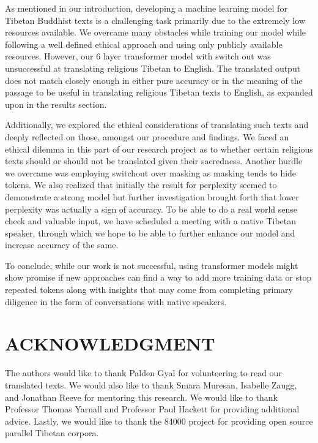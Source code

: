 \documentclass[letterpaper, 12 pt, conference]{ieeeconf}  %
\begin{document}
As mentioned in our introduction, developing a machine learning model for Tibetan Buddhist texts is a challenging task primarily due to the extremely low resources available. We overcame many obstacles while training our model  while following a well defined ethical approach and using only  publicly available resources. However, our 6 layer transformer model with switch out was unsuccessful at translating religious Tibetan to English. The translated output does not match closely enough in either pure accuracy or in the meaning of the passage to be useful in translating religious Tibetan texts to English, as expanded upon in the results section. \par
Additionally, we explored the ethical considerations of translating such texts and deeply reflected on those, amongst our procedure and findings. We faced an ethical dilemma in this part of our research project as to whether certain religious texts should or should not be translated given their sacredness. Another hurdle we overcame was employing switchout over masking as masking tends to hide tokens. We also realized that initially the result for perplexity seemed to demonstrate a strong model but further investigation brought forth that lower perplexity was actually a sign of accuracy.  To be able to do a real world sense check and valuable input, we have scheduled a meeting with a native Tibetan speaker, through which we hope to be able to further enhance our model and increase accuracy of the same.  \par
To conclude, while our work is not successful, using transformer models might show promise if new approaches can find a way to add more training data or stop repeated tokens along with insights that may come from completing primary diligence in the form of conversations with native speakers.



\section*{ACKNOWLEDGMENT}

The authors would like to thank Palden Gyal for volunteering to read our translated texts. We would also like to thank Smara Muresan, Isabelle Zaugg, and Jonathan Reeve for mentoring this research. We would like to thank Professor Thomas Yarnall and Professor Paul Hackett for providing additional advice. Lastly, we would like to thank the 84000 project for providing open source parallel Tibetan corpora. 
\end{document}
